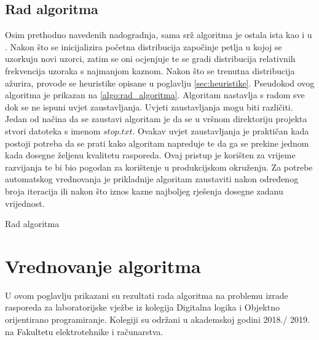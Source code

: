 \documentclass[times, utf8, zavrsni]{fer}
\begin{document}
\section{Rad algoritma}
Osim prethodno navedenih nadogradnja, sama srž algoritma je ostala ista kao i u \cite{DBLP:journals/tec/WuK14}. Nakon što se inicijalizira početna
distribucija započinje petlja u kojoj se uzorkuju novi uzorci, zatim se oni ocjenjuje te se gradi distribucija relativnih
frekvencija uzoraka s najmanjom kaznom. Nakon što se trenutna distribucija ažurira, provode se heuristike opisane u poglavlju
\ref{sec:heuristike}. Pseudokod ovog algoritma je prikazan na \ref{algo:rad_algoritma}. Algoritam nastavlja s radom
sve dok se ne ispuni uvjet zaustavljanja. Uvjeti zaustavljanja mogu biti
različiti. Jedan od načina da se zaustavi algoritam je da se u vršnom direktoriju projekta stvori datoteka s imenom
$stop.txt$. Ovakav uvjet zaustavljanja je praktičan kada postoji potreba da se prati kako algoritam napreduje te da ga se prekine
jednom kada dosegne željenu kvalitetu rasporeda. Ovaj pristup je korišten za vrijeme razvijanja te bi bio pogodan za korištenje
u produkcijskom okruženju. Za potrebe automatskog vrednovanja je prikladnije algoritam zaustaviti nakon određenog broja iteracija
ili nakon što iznos kazne najboljeg rješenja dosegne zadanu vrijednost.

\begin{algorithm}
  \caption{Rad algoritma}
  \label{algo:rad_algoritma}
  \begin{algorithmic}
  \REPEAT
  \end{algorithmic}
\end{algorithm}



\chapter{Vrednovanje algoritma}
U ovom poglavlju prikazani su rezultati rada algoritma na problemu izrade rasporeda za laboratorijske vježbe iz kolegija
Digitalna logika i Objektno orijentirano programiranje. Kolegiji su održani u akademskoj godini 2018./ 2019. na Fakultetu
elektrotehnike i računarstva.
\end{document}
